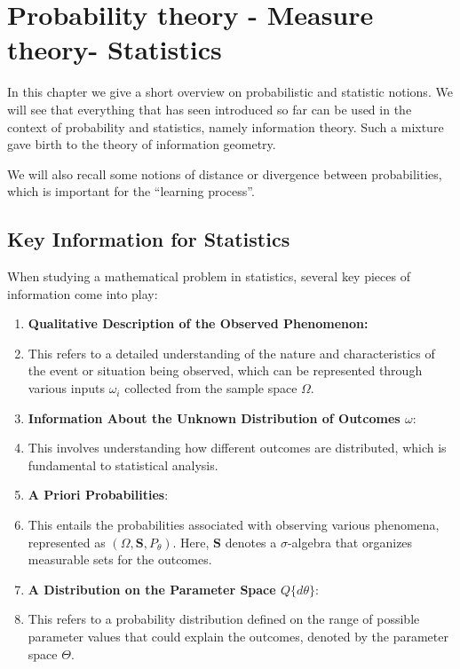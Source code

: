 \chapter{Probability theory - Measure theory- Statistics}

In this chapter we give a short overview on probabilistic and statistic notions.
We will see that everything that has seen introduced so far can be used in the context of probability and statistics,
namely information theory. Such a mixture gave birth to the theory of information geometry.  

We will also recall some notions of distance or divergence between probabilities, which is important for the ``learning process''.

\section{Key Information for Statistics}

When studying a mathematical problem in statistics, several key pieces of information come into play:
\begin{enumerate}
    \item  {\bf Qualitative Description of the Observed Phenomenon:} 
    
    \item[] This refers to a detailed understanding of the nature and characteristics of the event or situation being observed, which can be represented through various inputs $\omega_i$ collected from the sample space $\Omega$.
\item  {\bf Information About the Unknown Distribution of Outcomes $\omega$}: 
\item[]
This involves understanding how different outcomes are distributed, which is fundamental to statistical analysis.
\item  {\bf A Priori Probabilities}: 
\item[]
This entails the probabilities associated with observing various phenomena, represented as $(\Omega, \mathbf{S}, P_{\theta})$. Here, $\mathbf{S}$ denotes a $\sigma$-algebra that organizes measurable sets for the outcomes.
\item  {\bf A Distribution on the Parameter Space $Q\{d\theta\}$}:
\item[] This refers to a probability distribution defined on the range of possible parameter values that could explain the outcomes, denoted by the parameter space $\Theta$.
\end{enumerate}

